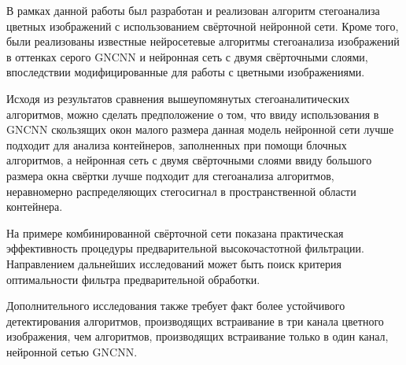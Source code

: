 

В рамках данной работы был разработан и реализован алгоритм стегоанализа цветных изображений с использованием свёрточной нейронной сети. Кроме того, были реализованы известные нейросетевые алгоритмы стегоанализа изображений в оттенках серого GNCNN и нейронная сеть с двумя свёрточными слоями, впоследствии модифицированные для работы с цветными изображениями.

Исходя из результатов сравнения вышеупомянутых стегоаналитических алгоритмов, можно сделать предположение о том, что ввиду использования в GNCNN скользящих окон малого размера данная модель нейронной сети лучше подходит для анализа контейнеров, заполненных при помощи блочных алгоритмов, а нейронная сеть с двумя свёрточными слоями ввиду большого размера окна свёртки лучше подходит для стегоанализа алгоритмов, неравномерно распределяющих стегосигнал в пространственной области контейнера.

На примере комбинированной свёрточной сети показана практическая эффективность процедуры предварительной высокочастотной фильтрации. Направлением дальнейших исследований может быть поиск критерия оптимальности фильтра предварительной обработки.

Дополнительного исследования также требует факт более устойчивого детектирования алгоритмов, производящих встраивание в три канала цветного изображения, чем алгоритмов, производящих встраивание только в один канал, нейронной сетью GNCNN.

\clearpage
